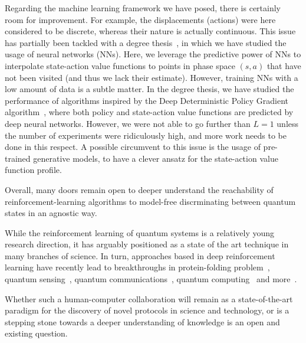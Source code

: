 Regarding the machine learning framework we have posed, there is certainly room for improvement. For example, the displacements (actions) were here considered to be discrete, whereas their nature is actually continuous. This issue has partially been tackled with a degree thesis~\cite{joseTFG}, in which we have studied the usage of neural networks (NNs). Here, we leverage the predictive power of NNs to interpolate state-action value functions to points in phase space $(s,a)$ that have not been visited (and thus we lack their estimate). However, training NNs with a low amount of data is a subtle matter. In the degree thesis, we have studied the performance of algorithms inspired by the Deep Deterministic Policy Gradient algorithm~\cite{DDPGpaper}, where both policy and state-action value functions are predicted by deep neural networks. However, we were not able to go further than $L=1$ unless the number of experiments were ridiculously high, and more work needs to be done in this respect. A possible circumvent to this issue is the usage of pre-trained generative models, to have a clever ansatz for the state-action value function profile.

Overall, many doors remain open to deeper understand the reachability of reinforcement-learning algorithms to model-free discrminating between quantum states in an agnostic way.

\bigskip

While the reinforcement learning of quantum systems is a relatively young research direction, it has arguably positioned as a state of the art technique in many branches of science. In turn, approaches based in deep reinforcement learning have recently lead to breakthroughs in protein-folding problem~\cite{Jumper2021}, quantum sensing~\cite{Schuff_2020}, quantum communications~\cite{PScomm}, quantum computing~\cite{Cerezo2021,foselgoogleRL} and more~\cite{Carleo2016,Torlai2016,VanNieuwenburg2017,Carrasquilla2017,Torlai2018,Melnikov2018,Fosel2018,Wallnofer2019,Bukov2017,Niu2019}.

Whether such a human-computer collaboration will remain as a state-of-the-art paradigm for the discovery of novel protocols in science and technology, or is a stepping stone towards a deeper understanding of knowledge is an open and existing question.
